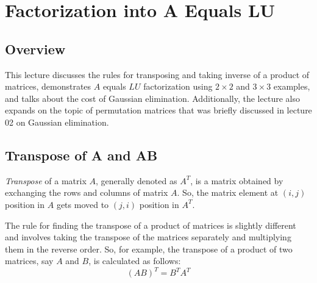 \documentclass[../main.tex]{subfiles}
\begin{document}
\section{Factorization into A Equals LU}


\subsection{Overview}
This lecture discusses the rules for transposing and taking inverse of a product of matrices, demonstrates \(A\) equals \(LU\) factorization using \(2 \times 2\) and \(3 \times 3\) examples, and talks about the cost of Gaussian elimination. Additionally, the lecture also expands on the topic of permutation matrices that was briefly discussed in lecture 02 on Gaussian elimination.


\subsection{Transpose of A and AB}
\emph{Transpose} of a matrix \(A\), generally denoted as \(A^{T}\), is a matrix obtained by exchanging the rows and columns of matrix \(A\). So, the matrix element at \((i, j)\) position in \(A\) gets moved to \((j, i)\) position in \(A^{T}\).
\vspace{0.5em}

The rule for finding the transpose of a product of matrices is slightly different and involves taking the transpose of the matrices separately and multiplying them in the reverse order. So, for example, the transpose of a product of two matrices, say \(A\) and \(B\), is calculated as follows:
\[
    (AB)^{T} = B^{T}A^{T}
\]


\end{document}

